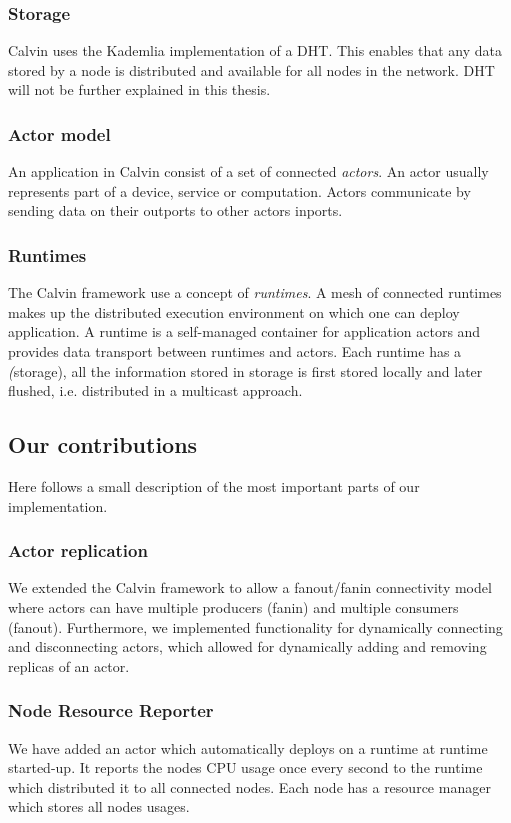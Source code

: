 \documentclass{cslthse-msc}
\begin{document}
\subsubsection{Storage} \label{sec:calvin_storage}
Calvin uses the Kademlia implementation of a DHT. This enables that any data stored by a node is distributed and available for all nodes in the network. DHT will not be further explained in this thesis.

\subsubsection{Actor model}
An application in Calvin consist of a set of connected \emph{actors}. An actor usually represents part of a device, service or computation. Actors communicate by sending data on their outports to other actors inports. %

\subsubsection{Runtimes}
The Calvin framework use a concept of \emph{runtimes}. A mesh of connected runtimes makes up the distributed execution environment on which one can deploy application. A runtime is a self-managed container for application actors and provides data transport between runtimes and actors. Each runtime has a \emph(storage), all the information stored in storage is first stored locally and later flushed, i.e. distributed in a multicast approach.

\subsection{Our contributions} \label{subsec:design_contributions} %
Here follows a small description of the most important parts of our implementation.

\subsubsection{Actor replication}
We extended the Calvin framework to allow a fanout/fanin connectivity model where actors can have multiple producers (fanin) and multiple consumers (fanout). Furthermore, we implemented functionality for dynamically connecting and disconnecting actors, which allowed for dynamically adding and removing replicas of an actor.

\subsubsection{Node Resource Reporter}
We have added an actor which automatically deploys on a runtime at runtime started-up. It reports the nodes CPU usage once every second to the runtime which distributed it to all connected nodes. Each node has a resource manager which stores all nodes usages.
\end{document}
